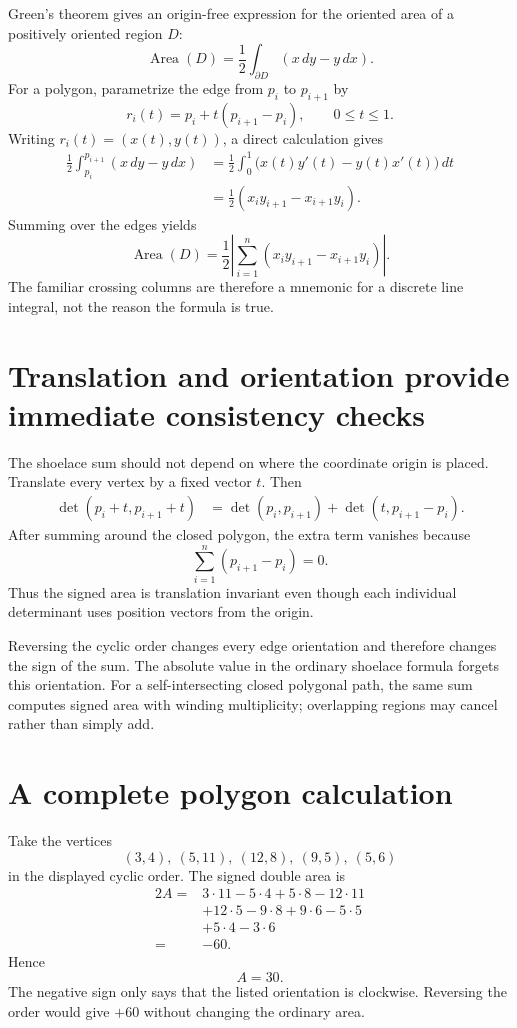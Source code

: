 Green's theorem gives an origin-free expression for the oriented area of a positively oriented region \(D\):
\[
  \operatorname{Area}(D)
  =\frac12\int_{\partial D}(x\,dy-y\,dx).
\]
For a polygon, parametrize the edge from \(p_i\) to \(p_{i+1}\) by
\[
  r_i(t)=p_i+t(p_{i+1}-p_i),
  \qquad 0\le t\le1.
\]
Writing \(r_i(t)=(x(t),y(t))\), a direct calculation gives
\[
\begin{aligned}
  \frac12\int_{p_i}^{p_{i+1}}(x\,dy-y\,dx)
  &=\frac12\int_0^1
  \bigl(x(t)y'(t)-y(t)x'(t)\bigr)\,dt\\
  &=\frac12(x_i y_{i+1}-x_{i+1}y_i).
\end{aligned}
\]
Summing over the edges yields
\[
  \boxed{
  \operatorname{Area}(D)
  =\frac12\left|
  \sum_{i=1}^n(x_i y_{i+1}-x_{i+1}y_i)
  \right|.}
\]
The familiar crossing columns are therefore a mnemonic for a discrete line integral, not the reason the formula is true.

\section{Translation and orientation provide immediate consistency checks}

The shoelace sum should not depend on where the coordinate origin is placed.  Translate every vertex by a fixed vector \(t\).  Then
\[
\begin{aligned}
  \det(p_i+t,p_{i+1}+t)
  &=\det(p_i,p_{i+1})
    +\det(t,p_{i+1}-p_i).
\end{aligned}
\]
After summing around the closed polygon, the extra term vanishes because
\[
  \sum_{i=1}^n(p_{i+1}-p_i)=0.
\]
Thus the signed area is translation invariant even though each individual determinant uses position vectors from the origin.

Reversing the cyclic order changes every edge orientation and therefore changes the sign of the sum.  The absolute value in the ordinary shoelace formula forgets this orientation.  For a self-intersecting closed polygonal path, the same sum computes signed area with winding multiplicity; overlapping regions may cancel rather than simply add.

\section{A complete polygon calculation}

Take the vertices
\[
  (3,4),\ (5,11),\ (12,8),\ (9,5),\ (5,6)
\]
in the displayed cyclic order.  The signed double area is
\[
\begin{aligned}
  2A={}&3\cdot11-5\cdot4
      +5\cdot8-12\cdot11\\
      &+12\cdot5-9\cdot8
      +9\cdot6-5\cdot5\\
      &+5\cdot4-3\cdot6\\
  ={}&-60.
\end{aligned}
\]
Hence
\[
  A=30.
\]
The negative sign only says that the listed orientation is clockwise.  Reversing the order would give \(+60\) without changing the ordinary area.


